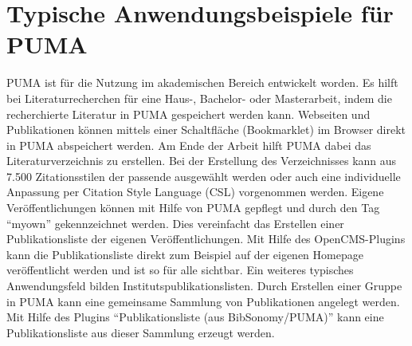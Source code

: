 \section{Typische Anwendungsbeispiele für PUMA}
PUMA ist für die Nutzung im akademischen Bereich entwickelt worden.
Es hilft bei Literaturrecherchen für eine Haus-, Bachelor- oder Masterarbeit, 
indem die recherchierte Literatur in PUMA gespeichert werden kann. Webseiten und 
Publikationen können mittels einer Schaltfläche (Bookmarklet) im Browser direkt 
in PUMA abspeichert werden. Am Ende der Arbeit hilft PUMA dabei das 
Literaturverzeichnis zu erstellen. Bei der Erstellung des Verzeichnisses kann 
aus 7.500 Zitationsstilen der passende ausgewählt werden oder auch eine 
individuelle Anpassung per Citation Style Language (CSL) vorgenommen werden.
\newline 
Eigene Veröffentlichungen können mit Hilfe von PUMA gepflegt und  durch den Tag 
\enquote{myown} gekennzeichnet werden. Dies vereinfacht das Erstellen einer 
Publikationsliste der eigenen Veröffentlichungen. Mit Hilfe des 
OpenCMS-Plugins kann die Publikationsliste direkt zum Beispiel auf der eigenen 
Homepage veröffentlicht werden und ist so für alle sichtbar.
\newline 
Ein weiteres typisches Anwendungsfeld bilden Institutspublikationslisten. 
Durch Erstellen einer Gruppe in PUMA kann eine gemeinsame Sammlung von 
Publikationen angelegt werden. Mit Hilfe des Plugins 
\enquote{Publikationsliste (aus BibSonomy/PUMA)}  kann eine Publikationsliste aus dieser 
Sammlung erzeugt werden.

   
